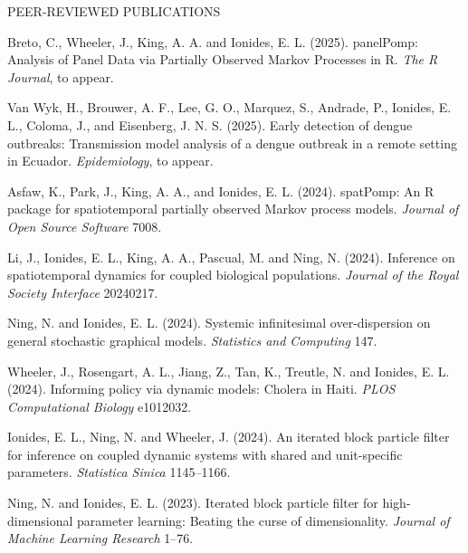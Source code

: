 \begin{reflist}{PEER-REVIEWED PUBLICATIONS}

\item Breto, C., Wheeler, J., King, A. A. and Ionides, E. L. (2025). panelPomp: Analysis of Panel Data via Partially Observed Markov Processes in R. {\it The R Journal}, to appear.

\item Van Wyk, H.,  Brouwer, A. F.,  Lee, G. O., Marquez, S., Andrade, P.,  Ionides, E. L., Coloma, J., and Eisenberg, J. N. S. (2025). Early detection of dengue outbreaks: Transmission model analysis of a dengue outbreak in a remote setting in Ecuador. {\it Epidemiology}, to appear.

\item Asfaw, K., Park, J., King, A. A., and Ionides, E. L. (2024). spatPomp: An R package for spatiotemporal partially observed Markov process models. {\it Journal of Open Source Software} {}{\separator}7008.
  
\item Li, J., Ionides, E. L., King, A. A., Pascual, M. and Ning, N. (2024). Inference on spatiotemporal dynamics for coupled biological populations. {\it Journal of the Royal Society Interface} {}{\separator}20240217.
  
\item Ning, N. and Ionides, E. L. (2024). Systemic infinitesimal over-dispersion on general stochastic graphical models. {\it Statistics and Computing} {}{\separator}147.

\item Wheeler, J., Rosengart, A. L., Jiang, Z., Tan, K., Treutle, 
  N. and Ionides, E. L. (2024). Informing policy via dynamic models: Cholera in Haiti. {\it PLOS Computational Biology} {}{\separator}e1012032.

\item Ionides, E. L., Ning, N. and Wheeler, J. (2024). An iterated block particle filter for inference on coupled dynamic systems with shared and unit-specific parameters. {\it Statistica Sinica} {}{\separator}1145--1166.

  \item Ning, N. and Ionides, E. L. (2023). Iterated block particle filter for high-dimensional parameter learning: Beating the curse of dimensionality. {\it Journal of Machine Learning Research} {}{\separator}1--76.


\end{reflist}
